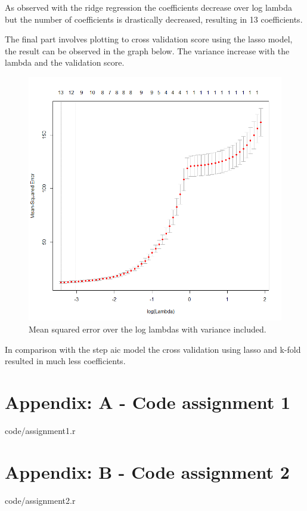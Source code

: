 \documentclass[a4paper,12pt]{article}
\begin{document}
As observed with the ridge regression the coefficients decrease over log lambda but the number of coefficients is drastically decreased, resulting in 13 coefficients.

The final part involves plotting to cross validation score using the lasso model, the result can be observed in the graph below. The variance increase with the lambda and the validation score.
\begin{figure}[H]
\centering
\begin{minipage}[]{0.75\textwidth}
  \includegraphics[width=\textwidth]{figures/Lab2A2_mse_cv_ll.png}  
  \caption{Mean squared error over the log lambdas with variance included.}
 \end{minipage}
\end{figure}

In comparison with the step aic model the cross validation using lasso and k-fold resulted in much less coefficients. 

\section{Appendix: A - Code assignment 1}


    {code/assignment1.r}

\section{Appendix: B - Code assignment 2}


    {code/assignment2.r}
\end{document}
